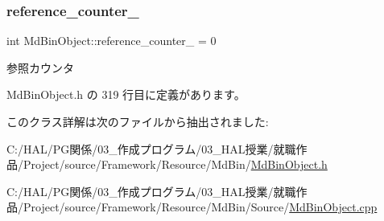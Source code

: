 \subsubsection{\texorpdfstring{reference\+\_\+counter\+\_\+}{reference\_counter\_}}
{\footnotesize\ttfamily int Md\+Bin\+Object\+::reference\+\_\+counter\+\_\+ = 0\hspace{0.3cm}{\ttfamily [private]}}



参照カウンタ 



 Md\+Bin\+Object.\+h の 319 行目に定義があります。



このクラス詳解は次のファイルから抽出されました\+:\begin{DoxyCompactItemize}
\item 
C\+:/\+H\+A\+L/\+P\+G関係/03\+\_\+作成プログラム/03\+\_\+\+H\+A\+L授業/就職作品/\+Project/source/\+Framework/\+Resource/\+Md\+Bin/\mbox{\hyperlink{_md_bin_object_8h}{Md\+Bin\+Object.\+h}}\item 
C\+:/\+H\+A\+L/\+P\+G関係/03\+\_\+作成プログラム/03\+\_\+\+H\+A\+L授業/就職作品/\+Project/source/\+Framework/\+Resource/\+Md\+Bin/\+Source/\mbox{\hyperlink{_md_bin_object_8cpp}{Md\+Bin\+Object.\+cpp}}\end{DoxyCompactItemize}

